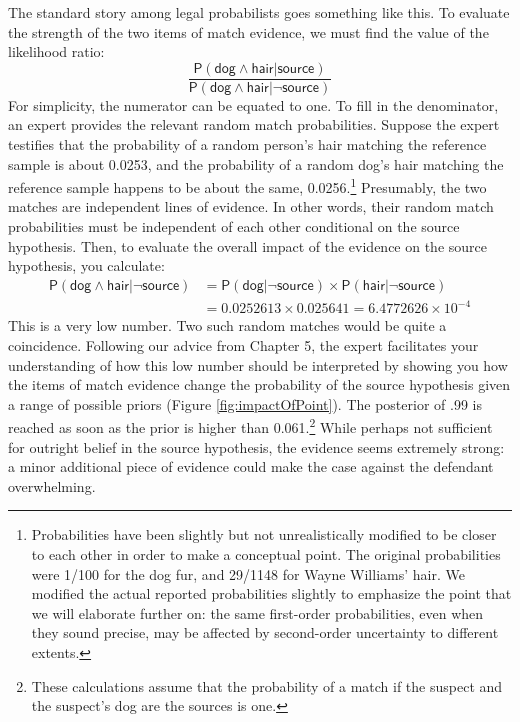 \documentclass[
  10pt,
  dvipsnames,enabledeprecatedfontcommands]{scrartcl}
\newcommand{\pr}[1]{\mathsf{P}(#1)}
\newcommand{\s}[1]{\mbox{$\mathsf{#1}$}}
\begin{document}
The standard story among legal probabilists goes something like this. To
evaluate the strength of the two items of match evidence, we must find
the value of the likelihood ratio:
\[\frac{\pr{\s{dog}\wedge \s{hair} \vert \s{source}}}{\pr{\s{dog}\wedge \s{hair} \vert \neg \s{source}}}\]
For simplicity, the numerator can be equated to one. To fill in the
denominator, an expert provides the relevant random match probabilities.
Suppose the expert testifies that the probability of a random person's
hair matching the reference sample is about 0.0253, and the probability
of a random dog's hair matching the reference sample happens to be about
the same, 0.0256.\footnote{Probabilities have been slightly but not
  unrealistically modified to be closer to each other in order to make a
  conceptual point. The original probabilities were 1/100 for the dog
  fur, and 29/1148 for Wayne Williams' hair. We modified the actual
  reported probabilities slightly to emphasize the point that we will
  elaborate further on: the same first-order probabilities, even when
  they sound precise, may be affected by second-order uncertainty to
  different extents.} Presumably, the two matches are independent lines
of evidence. In other words, their random match probabilities must be
independent of each other conditional on the source hypothesis. Then, to
evaluate the overall impact of the evidence on the source hypothesis,
you calculate: \begin{align*}
\pr{\s{dog}\wedge \s{hair} \vert \neg \s{source}} & = \pr{\s{dog} \vert \neg \s{source}} \times \pr{\s{hair} \vert \neg \s{source}} \\
& =  0.0252613 \times  0.025641 = \ensuremath{6.4772626\times 10^{-4}}
\end{align*} This is a very low number. Two such random matches would be
quite a coincidence. Following our advice from Chapter 5, the expert
facilitates your understanding of how this low number should be
interpreted by showing you how the items of match evidence change the
probability of the source hypothesis given a range of possible priors
(Figure \ref{fig:impactOfPoint}). The posterior of .99 is reached as
soon as the prior is higher than 0.061.\footnote{These calculations
  assume that the probability of a match if the suspect and the
  suspect's dog are the sources is one.} While perhaps not sufficient
for outright belief in the source hypothesis, the evidence seems
extremely strong: a minor additional piece of evidence could make the
case against the defendant overwhelming.
\end{document}
